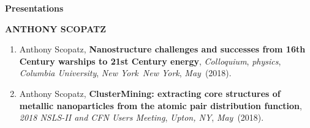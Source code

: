 \documentclass[prl,tighten,amsmath,amssymb,floatfix]{revtex4-1}
\begin{document}
\textbf{Presentations}

\textbf{ANTHONY SCOPATZ}
\vskip 12pt

\begin{enumerate}

\item Anthony Scopatz, {\bf Nanostructure challenges and successes from 16th Century warships to 21st Century energy},
{\it Colloquium},
{\it physics},
{\it Columbia University},
{\it New York}\
{\it New York},
{\it May}\
(2018).

\item Anthony Scopatz, {\bf ClusterMining: extracting core structures of metallic nanoparticles from the atomic pair distribution function},
{\it 2018 NSLS-II and CFN Users Meeting},
{\it Upton, NY},
{\it May}\
(2018).

\end{enumerate}
\end{document}
